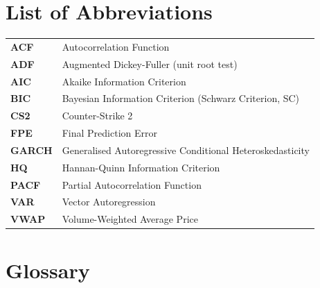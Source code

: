 \section*{List of Abbreviations}
\label{sec:abbreviations}

\begin{tabular}{p{3.5cm} p{10cm}}
  \textbf{ACF}   & Autocorrelation Function \\[4pt]
  \textbf{ADF}   & Augmented Dickey-Fuller (unit root test) \\[4pt]
  \textbf{AIC}   & Akaike Information Criterion \\[4pt]
  \textbf{BIC}   & Bayesian Information Criterion (Schwarz Criterion, SC) \\[4pt]
  \textbf{CS2}   & Counter-Strike 2 \\[4pt]
  \textbf{FPE}   & Final Prediction Error \\[4pt]
  \textbf{GARCH} & Generalised Autoregressive Conditional Heteroskedasticity \\[4pt]
  \textbf{HQ}    & Hannan-Quinn Information Criterion \\[4pt]
  \textbf{PACF}  & Partial Autocorrelation Function \\[4pt]
  \textbf{VAR}   & Vector Autoregression \\[4pt]
  \textbf{VWAP}  & Volume-Weighted Average Price \\[4pt]
\end{tabular}

\bigskip

\section*{Glossary}
\label{sec:glossary}

